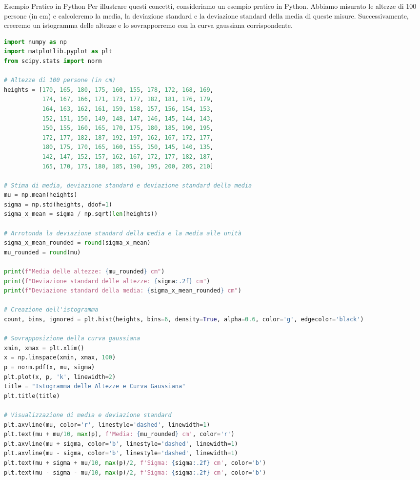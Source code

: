 \documentclass[12pt,a4paper,oneside]{book}
\makeatletter
\renewcommand{\section}{\@startsection{section}{1}{\z@}
{-4ex \@plus -1ex \@minus -.4ex}
{1ex \@plus.2ex }
{\normalfont\large\sffamily\bfseries}}
\theoremstyle{esercizio}
\makeatother
\begin{document}
\section{Esempio Pratico in Python}
Per illustrare questi concetti, consideriamo un esempio pratico in Python. Abbiamo misurato le altezze di 100 persone (in cm) e calcoleremo la media, la deviazione standard e la deviazione standard della media di queste misure. Successivamente, creeremo un istogramma delle altezze e lo sovrapporremo con la curva gaussiana corrispondente.

\begin{lstlisting}[language=Python, caption={Script Python per calcolare e visualizzare le altezze}]
import numpy as np
import matplotlib.pyplot as plt
from scipy.stats import norm

# Altezze di 100 persone (in cm)
heights = [170, 165, 180, 175, 160, 155, 178, 172, 168, 169, 
           174, 167, 166, 171, 173, 177, 182, 181, 176, 179, 
           164, 163, 162, 161, 159, 158, 157, 156, 154, 153, 
           152, 151, 150, 149, 148, 147, 146, 145, 144, 143,
           150, 155, 160, 165, 170, 175, 180, 185, 190, 195,
           172, 177, 182, 187, 192, 197, 162, 167, 172, 177,
           180, 175, 170, 165, 160, 155, 150, 145, 140, 135,
           142, 147, 152, 157, 162, 167, 172, 177, 182, 187,
           165, 170, 175, 180, 185, 190, 195, 200, 205, 210]

# Stima di media, deviazione standard e deviazione standard della media
mu = np.mean(heights)
sigma = np.std(heights, ddof=1)
sigma_x_mean = sigma / np.sqrt(len(heights))

# Arrotonda la deviazione standard della media e la media alle unità
sigma_x_mean_rounded = round(sigma_x_mean)
mu_rounded = round(mu)

print(f"Media delle altezze: {mu_rounded} cm")
print(f"Deviazione standard delle altezze: {sigma:.2f} cm")
print(f"Deviazione standard della media: {sigma_x_mean_rounded} cm")

# Creazione dell'istogramma
count, bins, ignored = plt.hist(heights, bins=6, density=True, alpha=0.6, color='g', edgecolor='black')

# Sovrapposizione della curva gaussiana
xmin, xmax = plt.xlim()
x = np.linspace(xmin, xmax, 100)
p = norm.pdf(x, mu, sigma)
plt.plot(x, p, 'k', linewidth=2)
title = "Istogramma delle Altezze e Curva Gaussiana"
plt.title(title)

# Visualizzazione di media e deviazione standard
plt.axvline(mu, color='r', linestyle='dashed', linewidth=1)
plt.text(mu + mu/10, max(p), f'Media: {mu_rounded} cm', color='r')
plt.axvline(mu + sigma, color='b', linestyle='dashed', linewidth=1)
plt.axvline(mu - sigma, color='b', linestyle='dashed', linewidth=1)
plt.text(mu + sigma + mu/10, max(p)/2, f'Sigma: {sigma:.2f} cm', color='b')
plt.text(mu - sigma - mu/10, max(p)/2, f'Sigma: {sigma:.2f} cm', color='b')


\end{lstlisting}
\end{document}
